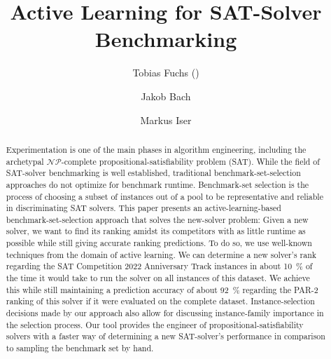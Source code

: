 \documentclass[runningheads]{llncs}
\begin{document}
\title{Active Learning for SAT-Solver Benchmarking}

\author{
	Tobias Fuchs (\Letter) \and
	Jakob Bach \and
	Markus Iser
}



\maketitle

\begin{abstract}
  Experimentation is one of the main phases in algorithm engineering, including the archetypal $\mathcal{NP}$-complete propositional-sat\-is\-fia\-bi\-li\-ty problem (SAT).
  While the field of SAT-solver benchmarking is well established, traditional benchmark-set-selection approaches do not optimize for benchmark runtime.
  Benchmark-set selection is the process of choosing a subset of instances out of a pool to be representative and reliable in discriminating SAT solvers.
  This paper presents an active-learning-based benchmark-set-selection approach that solves the new-solver problem:
  Given a new solver, we want to find its ranking amidst its competitors with as little runtime as possible while still giving accurate ranking predictions.
  To do so, we use well-known techniques from the domain of active learning.
  We can determine a new solver's rank regarding the SAT Competition 2022 Anniversary Track instances in about \SI{10}{\%} of the time it would take to run the solver on all instances of this dataset.
  We achieve this while still maintaining a prediction accuracy of about \SI{92}{\%} regarding the PAR-2 ranking of this solver if it were evaluated on the complete dataset.
  Instance-selection decisions made by our approach also allow for discussing instance-family importance in the selection process. 
  Our tool provides the engineer of propositional-satisfiability solvers with a faster way of determining a new SAT-solver's performance in comparison to sampling the benchmark set by hand.
\end{abstract}
\end{document}
